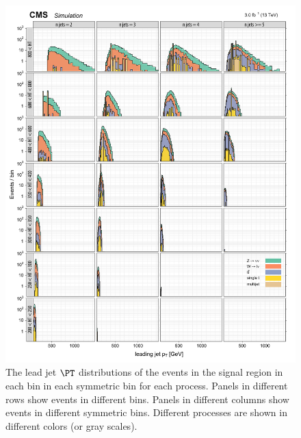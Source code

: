 \begin{figure}[!h]
\centering
\includegraphics[scale=0.95]{figures/kiplots/c150107_s150318_f015_jet_pt_0_100}
\caption{The lead jet $\PT$ distributions of the events in the signal
region in each \scalht bin in each symmetric \njet bin for each
process. Panels in different rows show events in different \scalht
bins. Panels in different columns show events in different symmetric
\njet bins. Different processes are shown in different colors (or gray
scales).} \label{c150107_s150318_f015_jet_pt_0_100}
\end{figure}

